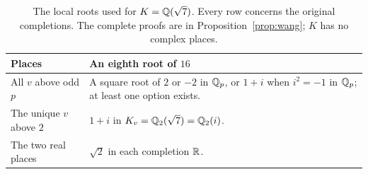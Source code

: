 \begin{table}[htbp]
\centering
\small
\caption{The local roots used for $K=\mathbb Q(\sqrt7)$.
Every row concerns the original completions.
The complete proofs are in Proposition~\ref{prop:wang};
$K$ has no complex places.}\label{tab:places}
\begin{tabular}{@{}p{}p{}@{}}
\toprule
Places & An eighth root of $16$ \\
\midrule
All $v$ above odd $p$
  & A square root of $2$ or $-2$ in $\mathbb Q_p$, or $1+i$
    when $i^2=-1$ in $\mathbb Q_p$; at least one option exists. \\[3pt]
The unique $v$ above $2$
  & $1+i$ in $K_v=\mathbb Q_2(\sqrt7)=\mathbb Q_2(i)$. \\[3pt]
The two real places
  & $\sqrt2$ in each completion $\mathbb R$. \\
\bottomrule
\end{tabular}
\end{table}
